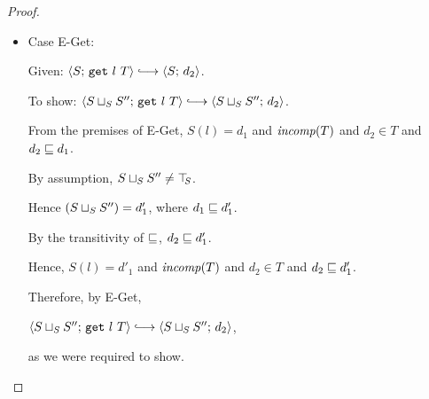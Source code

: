 \begin{proof}
\begin{itemize}
    \item Case {\sc E-Get}:

      Given: $\config{S}{\getexp{l}{T}} \parstepsto \config{S}{d_2}$.

      To show: $\config{\lubstore{S}{S''}}{\getexp{l}{T}} \parstepsto
      \config{\lubstore{S}{S''}}{d_2}$.

      From the premises of {\sc E-Get}, $S(l) = d_1$ and $\mathit{incomp}(T)$
      and $d_2 \in T$ and $d_2 \sqsubseteq d_1$.

      By assumption, $S \sqcup_{S} S'' \neq \top\hspace{-0.85mm}_{S}$.

      Hence $(S \sqcup_{S} S'') = d'_1$, where $d_1 \sqsubseteq d'_1$.

      By the transitivity of $\sqsubseteq$, $d_2 \sqsubseteq d'_1$.

      Hence, $S(l) = d'_1$ and $\mathit{incomp}(T)$ and $d_2 \in T$ and $d_2
      \sqsubseteq d'_1$.

      Therefore, by {\sc E-Get},

      $\config{\lubstore{S}{S''}}{\getexp{l}{T}} \parstepsto
      \config{\lubstore{S}{S''}}{d_2}$,

      as we were required to show.
  \end{itemize}
\end{proof}
